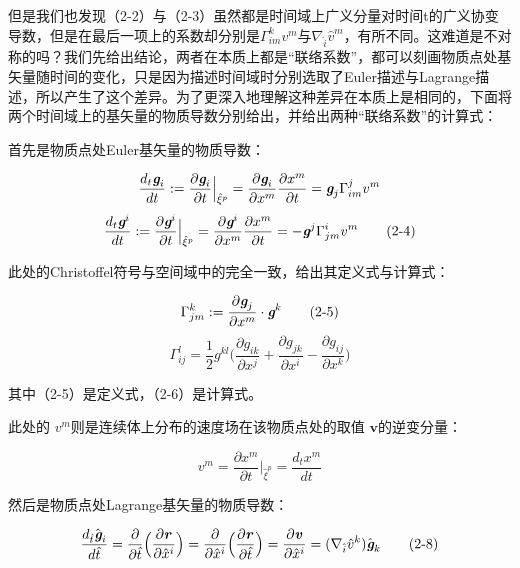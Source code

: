 \documentclass[UTF8]{ctexart}
\begin{document}
但是我们也发现（2-2）与（2-3）虽然都是时间域上广义分量对时间t的广义协变导数，但是在最后一项上的系数却分别是$\Gamma_{im}^{k} v^m$与$\nabla_{\hat{i}} \hat{v}^m$，有所不同。这难道是不对称的吗？我们先给出结论，两者在本质上都是“联络系数”，都可以刻画物质点处基矢量随时间的变化，只是因为描述时间域时分别选取了Euler描述与Lagrange描述，所以产生了这个差异。为了更深入地理解这种差异在本质上是相同的，下面将两个时间域上的基矢量的物质导数分别给出，并给出两种“联络系数”的计算式：\par
首先是物质点处Euler基矢量的物质导数：\par
\begin{equation*}
    \frac{d_t \textit{\textbf{g}}_i}{dt}:=\frac{\partial \textit{\textbf{g}}_i}{\partial t}\Big|_{\hat{\xi}^p}=\frac{\partial \textit{\textbf{g}}_i}{\partial x^m}\frac{\partial x^m}{\partial t}= \textit{\textbf{g}}_j\Gamma_{im}^j v^m
\end{equation*}
\begin{equation*}
    \frac{d_t \textit{\textbf{g}}^i}{dt}:=\frac{\partial \textit{\textbf{g}}^i}{\partial t}\Big|_{\hat{\xi}^p}=\frac{\partial \textit{\textbf{g}}^i}{\partial x^m}\frac{\partial x^m}{\partial t}=- \textit{\textbf{g}}^j\Gamma_{jm}^i v^m
    \tag{2-4}
\end{equation*}
\par
此处的Christoffel符号与空间域中的完全一致，给出其定义式与计算式：\par
\begin{equation*}
    \Gamma_{jm}^k := \frac{\partial \textit{\textbf{g}}_j}{\partial x^m}\cdot \textit{\textbf{g}}^k
    \tag{2-5}
\end{equation*}
\begin{equation*}
    \Gamma_{ij}^l = \frac{1}{2} g^{kl}\Big( \frac{\partial g_{ik}}{\partial x^j}
    +\frac{\partial g_{jk}}{\partial x^i} -\frac{\partial g_{ij}}{\partial x^k} \Big)
    \tag{2-6}
\end{equation*}
\par
其中（2-5）是定义式，（2-6）是计算式。\par
此处的 $v^m$则是连续体上分布的速度场在该物质点处的取值 $\textbf{v}$的逆变分量：\par
\begin{equation*}
    v^m=\frac{\partial x^m}{\partial t}\Big|_{\hat{\xi}^p}=\frac{d_t x^m}{dt}
    \tag{2-7}
\end{equation*}
\par
然后是物质点处Lagrange基矢量的物质导数：\par
\begin{equation*}
     \frac{d_{\hat{t}} \hat{\textit{\textbf{g}}}_i}{d\hat{t}}=
     \frac{\partial}{\partial \hat{t}}
     \Big(\frac{\partial\textbf{\textit{r}}}{\partial \hat x^i}\Big)=
     \frac{\partial}{\partial \hat x^i}
     \Big(\frac{\partial\textbf{\textit{r}}}{\partial \hat{t}}\Big)=
     \frac{\partial\textbf{\textit{v}}}{\partial \hat x^i}=
     (\nabla_{\hat{i}} {\hat{v}}^k) \hat{\textit{\textbf{g}}}_k
     \tag{2-8}
\end{equation*}
\end{document}

